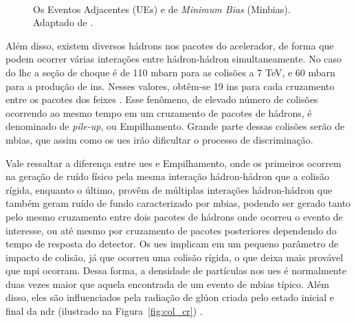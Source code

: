 \begin{figure}[ht!]
    \label{fig:minbxue}
    \begin{center}
%
        \\ 
    \end{center}
    \caption[Os Eventos Adjacentes (UEs) e de \emph{Minimum Bias} (Minbias)]{%
       Os Eventos Adjacentes (UEs) e de \emph{Minimum Bias} (Minbias). 
Adaptado de \cite{rick_field_slides}.
     }%
\end{figure}

Além disso, existem diversos hádrons nos pacotes do acelerador, de forma que podem
ocorrer várias interações entre hádron-hádron simultaneamente. No caso do \gls{lhc} 
a seção de choque é de 110 mbarn para as colisões a 7 TeV, e
60 mbarn para a produção de \glspl{in}.
Nesses valores, obtêm-se 19 \glspl{in} para cada
cruzamento entre os pacotes dos feixes \cite{webLHC,ATLAS_TDR}. Esse fenômeno, de elevado número de
colisões ocorrendo ao mesmo tempo em um cruzamento de pacotes de hádrons, é
denominado de \emph{pile-up}, ou Empilhamento. Grande parte dessas colisões 
serão de \gls{mbias}, que assim como os \glspl{ue} irão
dificultar o processo de discriminação.

Vale ressaltar a diferença entre \glspl{ue}
e Empilhamento, onde os primeiros ocorrem na geração de ruído físico
pela mesma interação hádron-hádron que a colisão rígida, enquanto o
último, provêm de múltiplas interações hádron-hádron que também geram ruído de
fundo caracterizado por \gls{mbias}, podendo ser gerado tanto pelo mesmo cruzamento 
entre dois pacotes de hádrons onde ocorreu o evento de interesse, 
ou até mesmo por cruzamento de pacotes 
posteriores dependendo do tempo de resposta do detector. 
Os \glspl{ue} implicam em um pequeno parâmetro de
impacto de colisão, já que ocorreu uma colisão rígida, o que deixa mais 
provável que \gls{mpi} ocorram.
Dessa forma, a densidade de partículas nos \glspl{ue} é normalmente duas vezes
maior que aquela encontrada de um evento de \gls{mbias} típico.
Além disso, eles são influenciados pela
radiação de glúon criada pelo estado inicial e final da \gls{ndr} (ilustrado na
Figura~\ref{fig:col_cr})
\cite{Underlying}. 

